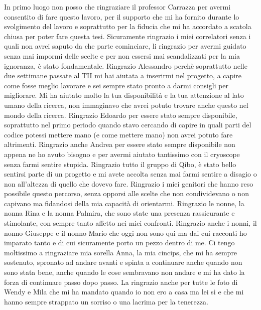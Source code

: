 \begin{comment}
    Carrazza
    Alessandro, Edoardo, Andrea
    Altri collaboratori di Qibo
    Alessia
    Sara & Silvia
    Tutti amici uni
    Anna, genitori nonna
\end{comment}

In primo luogo non posso che ringraziare il professor Carrazza per avermi consentito di fare questo lavoro, per il supporto che mi ha fornito durante lo svolgimento del lavoro e soprattutto per la fiducia che mi ha accordato a scatola chiusa per poter fare questa tesi.
Sicuramente ringrazio i miei correlatori senza i quali non avrei saputo da che parte cominciare, li ringrazio per avermi guidato senza mai impormi delle scelte e per non essersi mai scandalizzati per la mia ignoranza, è stato fondamentale.
Ringrazio Alessandro perchè soprattutto nelle due settimane passate al TII mi hai aiutata a inserirmi nel progetto, a capire come fosse meglio lavorare e sei sempre stato pronto a darmi consigli per migliorare. Mi ha aiutato molto la tua disponibilità e la tua attenzione al lato umano della ricerca, non immaginavo che avrei potuto trovare anche questo nel mondo della ricerca. 
Ringrazio Edoardo per essere stato sempre disponibile, soprattutto nel primo periodo quando stavo cercando di capire in quali parti del codice potessi mettere mano (e come mettere mano) non avrei potuto fare altrimenti.
Ringrazio anche Andrea per essere stato sempre disponibile non appena ne ho avuto bisogno e per avermi aiutato tantissimo con il cryoscope senza farmi sentire stupida.
Ringrazio tutto il gruppo di Qibo, è stato bello sentirsi parte di un progetto e mi avete accolta senza mai farmi sentire a disagio o non all'altezza di quello che dovevo fare.
Ringrazio i miei genitori che hanno reso possibile questo percorso, senza opporsi alle scelte che non condividevano o non capivano ma fidandosi della mia capacità di orientarmi.
Ringrazio le nonne, la nonna Rina e la nonna Palmira, che sono state una presenza rassicurante e stimolante, con sempre tanto affetto nei miei confronti. 
Ringrazio anche i nonni, il nonno Giuseppe e il nonno Mario che oggi non sono qui ma dai cui racconti ho imparato tanto e di cui sicuramente porto un pezzo dentro di me.
Ci tengo moltissimo a ringraziare mia sorella Anna, la mia cincips, che mi ha sempre sostenuto, spronato ad andare avanti e spinta a continuare anche quando non sono stata bene, anche quando le cose sembravano non andare e mi ha dato la forza di continuare passo dopo passo.
La ringrazio anche per tutte le foto di Wendy e Mila che mi ha mandato quando io non ero a casa ma lei sì e che mi hanno sempre strappato un sorriso o una lacrima per la tenerezza.
